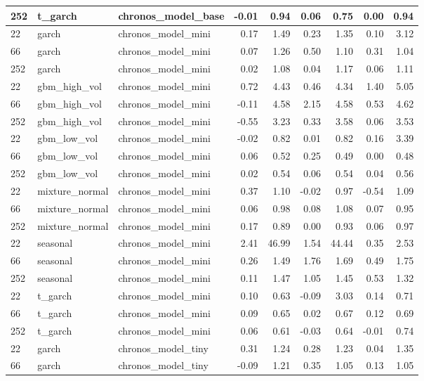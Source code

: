 {\begin{tabular}{lllrrrrrr}
252 & t\_garch & chronos\_model\_base & -0.01 & 0.94 & 0.06 & 0.75 & 0.00 & 0.94 \\
\midrule
22 & garch & chronos\_model\_mini & 0.17 & 1.49 & 0.23 & 1.35 & 0.10 & 3.12 \\
66 & garch & chronos\_model\_mini & 0.07 & 1.26 & 0.50 & 1.10 & 0.31 & 1.04 \\
252 & garch & chronos\_model\_mini & 0.02 & 1.08 & 0.04 & 1.17 & 0.06 & 1.11 \\
\midrule
22 & gbm\_high\_vol & chronos\_model\_mini & 0.72 & 4.43 & 0.46 & 4.34 & 1.40 & 5.05 \\
66 & gbm\_high\_vol & chronos\_model\_mini & -0.11 & 4.58 & 2.15 & 4.58 & 0.53 & 4.62 \\
252 & gbm\_high\_vol & chronos\_model\_mini & -0.55 & 3.23 & 0.33 & 3.58 & 0.06 & 3.53 \\
\midrule
22 & gbm\_low\_vol & chronos\_model\_mini & -0.02 & 0.82 & 0.01 & 0.82 & 0.16 & 3.39 \\
66 & gbm\_low\_vol & chronos\_model\_mini & 0.06 & 0.52 & 0.25 & 0.49 & 0.00 & 0.48 \\
252 & gbm\_low\_vol & chronos\_model\_mini & 0.02 & 0.54 & 0.06 & 0.54 & 0.04 & 0.56 \\
\midrule
22 & mixture\_normal & chronos\_model\_mini & 0.37 & 1.10 & -0.02 & 0.97 & -0.54 & 1.09 \\
66 & mixture\_normal & chronos\_model\_mini & 0.06 & 0.98 & 0.08 & 1.08 & 0.07 & 0.95 \\
252 & mixture\_normal & chronos\_model\_mini & 0.17 & 0.89 & 0.00 & 0.93 & 0.06 & 0.97 \\
\midrule
22 & seasonal & chronos\_model\_mini & 2.41 & 46.99 & 1.54 & 44.44 & 0.35 & 2.53 \\
66 & seasonal & chronos\_model\_mini & 0.26 & 1.49 & 1.76 & 1.69 & 0.49 & 1.75 \\
252 & seasonal & chronos\_model\_mini & 0.11 & 1.47 & 1.05 & 1.45 & 0.53 & 1.32 \\
\midrule
22 & t\_garch & chronos\_model\_mini & 0.10 & 0.63 & -0.09 & 3.03 & 0.14 & 0.71 \\
66 & t\_garch & chronos\_model\_mini & 0.09 & 0.65 & 0.02 & 0.67 & 0.12 & 0.69 \\
252 & t\_garch & chronos\_model\_mini & 0.06 & 0.61 & -0.03 & 0.64 & -0.01 & 0.74 \\
\midrule
22 & garch & chronos\_model\_tiny & 0.31 & 1.24 & 0.28 & 1.23 & 0.04 & 1.35 \\
66 & garch & chronos\_model\_tiny & -0.09 & 1.21 & 0.35 & 1.05 & 0.13 & 1.05 \\

\end{tabular}}
